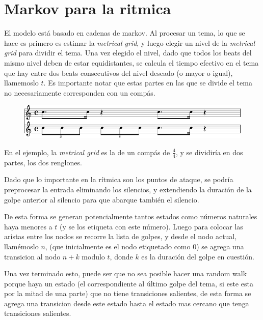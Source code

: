 


\section{Markov para la ritmica}
El modelo est\'a basado en cadenas de markov. Al procesar un tema, lo que se hace es primero es estimar la \emph{metrical 
grid}, y luego elegir un nivel de la \emph{metrical grid} para dividir el tema.
Una vez elegido el nivel, dado que todos los beats del mismo nivel deben de estar equidistantes, se calcula el 
tiempo efectivo en el tema que hay entre dos beats consecutivos del nivel deseado (o mayor o igual), llamemoslo $t$.
Es importante notar que estas partes en las que se divide el tema no necesariamente corresponden con un comp\'as.

\begin{figure}[h]
\begin{center}
\includegraphics[width=12cm]{rythm_markov/images/reggae.png}
\label{fig:reggae}
\end{center}
\end{figure}

En el ejemplo, la \emph{metrical grid} es la de un comp\'as de $\frac{4}{4}$, y se dividir\'ia en dos partes, los dos renglones.

Dado que lo importante en la r\'itmica son los puntos de ataque, se podr\'ia preprocesar la entrada eliminando los silencios, y  
extendiendo la duraci\'on de la golpe anterior al silencio para que abarque tambi\'en el silencio.

De esta forma se generan potencialmente tantos estados como n\'umeros naturales haya menores a $t$ (y se los etiqueta con este n\'umero).
Luego para colocar las aristas entre los nodos se recorre la lista de golpes, y desde el nodo actual, llam\'emoslo
$n$, (que inicialmente es el nodo etiquetado como 0) se agrega una transicion al nodo $n+k$ modulo $t$,
donde $k$ es la duraci\'on del golpe en cuesti\'on.

Una vez terminado esto, puede ser que no sea posible hacer una random walk porque haya un estado (el correspondiente al \'ultimo golpe del tema, si 
este esta por la mitad de una parte) 
que no tiene transiciones salientes, de esta forma se agrega una transicion desde este estado hasta el estado mas cercano
que tenga transiciones salientes.

